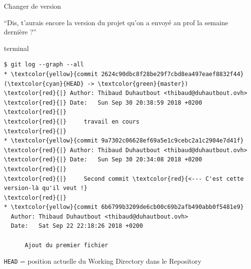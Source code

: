 \documentclass[usepdftitle=false]{beamer}
\def\seplength{.3\topsep}
\newcommand{\Pause}{%
\ifdef{\Release}
  {\pause}
  {}
}
\begin{document}
\begin{frame}[fragile]{Changer de version}
	\begin{block}{}
		\enquote{Dis, t'aurais encore la version du projet qu'on a envoyé au prof la semaine dernière ?}
	\end{block}

	\Pause

	\begin{beamercolorbox}[rounded=true,shadow=true]{terminal}
\vspace{-\seplength}
\begin{Verbatim}
$ git log --graph --all
* \textcolor{yellow}{commit 2624c90dbc8f28be29f7cbd8ea497eaef8832f44} (\textcolor{cyan}{HEAD} -> \textcolor{green}{master})
\textcolor{red}{|} Author: Thibaud Duhautbout <thibaud@duhautbout.ovh>
\textcolor{red}{|} Date:   Sun Sep 30 20:38:59 2018 +0200
\textcolor{red}{|}
\textcolor{red}{|}     travail en cours
\textcolor{red}{|}
* \textcolor{yellow}{commit 9a7302c06628ef69a5e1c9cebc2a1c2904e7d41f}
\textcolor{red}{|} Author: Thibaud Duhautbout <thibaud@duhautbout.ovh>
\textcolor{red}{|} Date:   Sun Sep 30 20:34:08 2018 +0200
\textcolor{red}{|}
\textcolor{red}{|}     Second commit \textcolor{red}{<--- C'est cette version-là qu'il veut !}
\textcolor{red}{|}
* \textcolor{yellow}{commit 6b6799b3209de6cb00c69b2afb490abb0f5481e9}
  Author: Thibaud Duhautbout <thibaud@duhautbout.ovh>
  Date:   Sat Sep 22 22:18:26 2018 +0200

      Ajout du premier fichier
\end{Verbatim}
	\end{beamercolorbox}

		\verb+HEAD+ = position actuelle du Working Directory dans le Repository
\end{frame}
\end{document}
